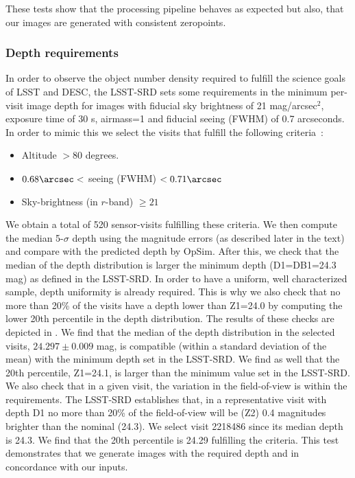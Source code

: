 \documentclass[\docopts]{\docclass}
\begin{document}
These tests show that the processing pipeline behaves as expected but also, that our images are generated with consistent zeropoints.

\subsubsection{Depth requirements}
\label{sssec:depth}
In order to observe the object number density required to fulfill the science goals of LSST and DESC, the LSST-SRD sets some requirements in the minimum per-visit image depth for images with fiducial sky brightness of 21 mag/arcsec$^2$, exposure time of 30 s, airmass=1 and fiducial seeing (FWHM) of 0.7 arcseconds. In order to mimic this we select the visits that fulfill the following criteria~\citep{LPM-17}:
\begin{itemize}
\item Altitude $> 80$ degrees.
\item $0.68\arcsec <$ seeing (FWHM) $ < 0.71\arcsec$
\item Sky-brightness (in $r$-band) $ \geq 21$ 
\end{itemize}
We obtain a total of 520 sensor-visits fulfilling these criteria. We then compute the median 5-$\sigma$ depth  using the magnitude errors (as described later in the text) and compare with the predicted depth by OpSim. After this, we check that the median of the depth distribution is larger the minimum depth (D1=DB1=24.3 mag) as defined in the LSST-SRD. In order to have a uniform, well characterized sample, depth uniformity is already required. This is why we also check that no more than 20\% of the visits have a depth lower than Z1=24.0 by computing the lower 20th percentile in the depth distribution. The results of these checks are depicted in . We find that the median of the depth distribution in the selected visits, $24.297 \pm 0.009$ mag, is compatible (within a standard deviation of the mean) with the minimum depth set in the LSST-SRD. We find as well that the 20th percentile, Z1=24.1, is larger than the minimum value set in the LSST-SRD. We also check that in a given visit, the variation in the field-of-view is within the requirements. The LSST-SRD establishes that, in a representative visit with depth D1 no more than 20\% of the field-of-view will be (Z2) 0.4 magnitudes brighter than the nominal (24.3). We select visit 2218486 since its median depth is 24.3. We find that the 20th percentile is 24.29 fulfilling the criteria. This test demonstrates that we generate images with the required depth and in concordance with our inputs.
\end{document}
